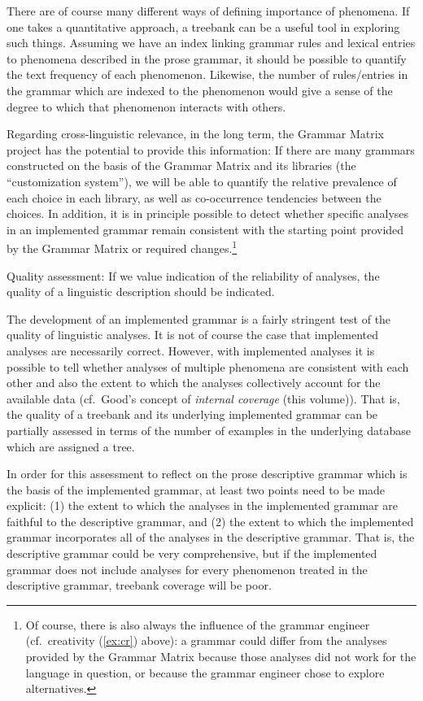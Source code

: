 \documentclass[12pt]{article}
\begin{document}
There are of course many different ways of defining importance
of phenomena.  If one takes a quantitative approach, a treebank can
be a useful tool in exploring such things. Assuming we have an index
linking grammar rules and lexical entries to phenomena described in the
prose grammar, it should be possible to quantify the text
frequency of each phenomenon.  Likewise, the number of rules/entries
in the grammar which are indexed to the phenomenon would give a 
sense of the degree to which that phenomenon interacts with others.

Regarding cross-linguistic relevance, in the long term, the Grammar
Matrix project has the potential to provide this information:  If
there are many grammars constructed on the basis of the Grammar
Matrix and its libraries (the ``customization system''), we will
be able to quantify the relative prevalence of each choice in each
library, as well as co-occurrence tendencies between the choices.
In addition, it is in principle possible to detect whether 
specific analyses in an implemented grammar remain consistent with
the starting point provided by the Grammar Matrix or required changes.\footnote{Of course, there is also always the influence of the grammar engineer
(cf.\ {\sc creativity} (\ref{ex:cr}) above): a grammar could differ
from the analyses provided by the Grammar Matrix because those analyses
did not work for the language in question, or because the grammar
engineer chose to explore alternatives.}

\begin{exe}
\ex\label{ex:qa} {\sc Quality assessment:} If we value indication of
the reliability of analyses, the quality of a linguistic description
should be indicated.
\end{exe}

The development of an implemented grammar is a fairly stringent test
of the quality of linguistic analyses.  It is not of course the case
that implemented analyses are necessarily correct.  However, with
implemented analyses it is possible to tell whether analyses of
multiple phenomena are consistent with each other and also the extent
to which the analyses collectively account for the available data (cf.\
Good's concept of {\it internal coverage} (this volume)). \nocite{Good:tv}
That is, the quality of a treebank and its underlying implemented
grammar can be partially assessed in terms of the number of examples
in the underlying database which are assigned a tree.

In order for this assessment to reflect on the prose descriptive
grammar which is the basis of the implemented grammar, at least two
points need to be made explicit: (1) the extent to which the analyses
in the implemented grammar are faithful to the descriptive grammar, and
(2) the extent to which the implemented grammar incorporates all of the
analyses in the descriptive grammar.  That is, the descriptive grammar
could be very comprehensive, but if the implemented grammar does not
include analyses for every phenomenon treated in the descriptive
grammar, treebank coverage will be poor.
\end{document}
